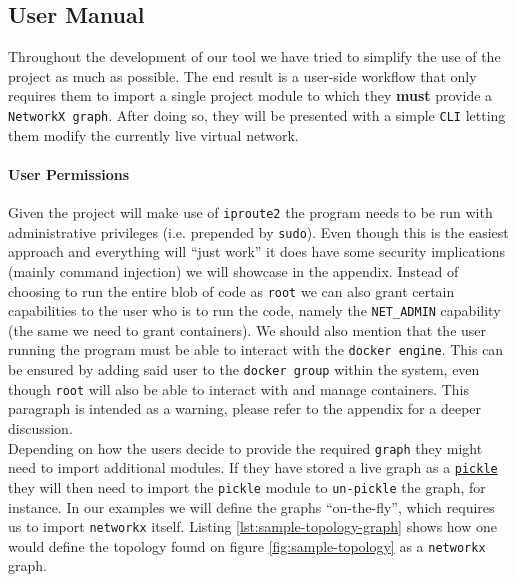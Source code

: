         \subsection{User Manual}
            Throughout the development of our tool we have tried to simplify the use of the project as much as possible. The end result is a user-side workflow that only requires them to import a single project module to which they \textbf{must} provide a \texttt{NetworkX graph}. After doing so, they will be presented with a simple \texttt{CLI} letting them modify the currently live virtual network.\\

            \paragraph{User Permissions}
                Given the project will make use of \texttt{iproute2} the program needs to be run with administrative privileges (i.e. prepended by \texttt{sudo}). Even though this is the easiest approach and everything will ``just work'' it does have some security implications (mainly command injection) we will showcase in the appendix. Instead of choosing to run the entire blob of code as \texttt{root} we can also grant certain capabilities to the user who is to run the code, namely the \texttt{NET\_ADMIN} capability (the same we need to grant containers). We should also mention that the user running the program must be able to interact with the \texttt{docker engine}. This can be ensured by adding said user to the \texttt{docker group} within the system, even though \texttt{root} will also be able to interact with and manage containers. This paragraph is intended as a warning, please refer to the appendix for a deeper discussion.\\

            Depending on how the users decide to provide the required \texttt{graph} they might need to import additional modules. If they have stored a live graph as a \href{https://docs.python.org/3/library/pickle.html}{\texttt{pickle}} they will then need to import the \texttt{pickle} module to \texttt{un-pickle} the graph, for instance. In our examples we will define the graphs ``on-the-fly'', which requires us to import \texttt{networkx} itself. Listing \ref{lst:sample-topology-graph} shows how one would define the topology found on figure \ref{fig:sample-topology} as a \texttt{networkx} graph.\\


